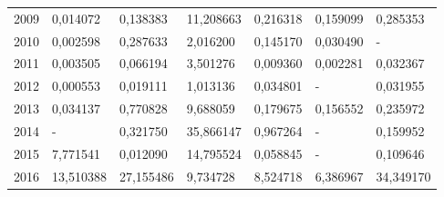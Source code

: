 \begin{table}
\begin{tabular}{p{1cm}p{2cm}p{2cm}p{2cm}p{2cm}p{2cm}p{2cm}}
 2009 &                            0,014072 &        0,138383 &                                  11,208663 &          0,216318 &                      0,159099 &                                  0,285353 \\
 2010 &                            0,002598 &        0,287633 &                                   2,016200 &          0,145170 &                      0,030490 &                                         - \\
 2011 &                            0,003505 &        0,066194 &                                   3,501276 &          0,009360 &                      0,002281 &                                  0,032367 \\
 2012 &                            0,000553 &        0,019111 &                                   1,013136 &          0,034801 &                             - &                                  0,031955 \\
 2013 &                            0,034137 &        0,770828 &                                   9,688059 &          0,179675 &                      0,156552 &                                  0,235972 \\
 2014 &                                   - &        0,321750 &                                  35,866147 &          0,967264 &                             - &                                  0,159952 \\
 2015 &                            7,771541 &        0,012090 &                                  14,795524 &          0,058845 &                             - &                                  0,109646 \\
 2016 &                           13,510388 &       27,155486 &                                   9,734728 &          8,524718 &                      6,386967 &                                 34,349170 \\
\bottomrule
\end{tabular}
\end{table}
